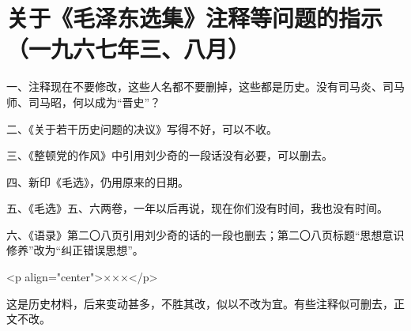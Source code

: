 \section[关于《毛泽东选集》注释等问题的指示（一九六七年三、八月）]{关于《毛泽东选集》注释等问题的指示（一九六七年三、八月）}


一、注释现在不要修改，这些人名都不要删掉，这些都是历史。没有司马炎、司马师、司马昭，何以成为“晋史”？

二、《关于若干历史问题的决议》写得不好，可以不收。

三、《整顿党的作风》中引用刘少奇的一段话没有必要，可以删去。

四、新印《毛选》，仍用原来的日期。

五、《毛选》五、六两卷，一年以后再说，现在你们没有时间，我也没有时间。

六、《语录》第二〇八页引用刘少奇的话的一段也删去；第二〇八页标题“思想意识修养”改为“纠正错误思想”。


<p align="center">×××</p>

这是历史材料，后来变动甚多，不胜其改，似以不改为宜。有些注释似可删去，正文不改。


